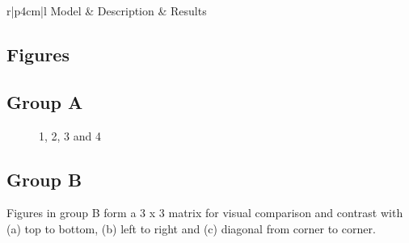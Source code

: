 \centering	
\begin{table}[H]\tiny
	\caption{}	
	\begin{tabular}{r|p{4cm}|l}
		\hline	
		Model & Description & Results \\
		\hline 
		\hline 
	\end{tabular}
\end{table}


\subsection{Figures}

\subsection{Group A}

\begin{figure}[H]
	\centering
	\begin{minipage}[b]{0.5\linewidth}
	\end{minipage}\hfill
	\begin{minipage}[b]{0.5\linewidth}
	\end{minipage}\hfill	
	\begin{minipage}[b]{0.5\linewidth}
	\end{minipage}\hfill
	\begin{minipage}[b]{0.5\linewidth}
	\end{minipage}\hfill
	\caption{1, 2, 3 and 4}
	\label{fig:Figure1}
\end{figure} 

\subsection{Group B}

Figures in group B form a 3 x 3 matrix for visual comparison and contrast with (a) top to bottom, (b) left to right and (c) diagonal from corner to corner.

